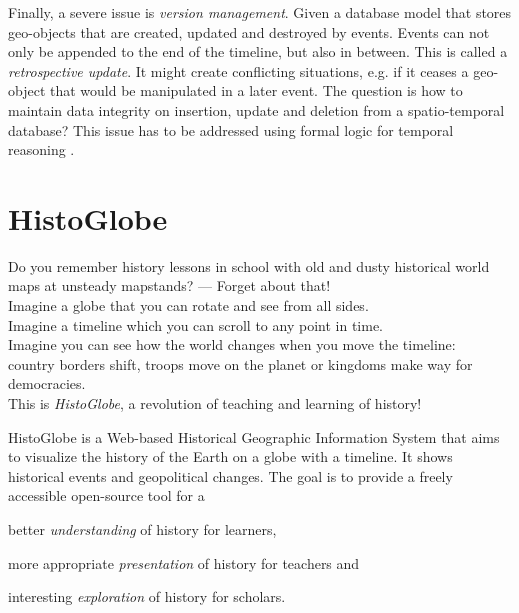 Finally, a severe issue is \emph{version management}. Given a database model that stores geo-objects that are created, updated and destroyed by events. Events can not only be appended to the end of the timeline, but also in between. This is called a \emph{retrospective update}. It might create conflicting situations, e.g. if it ceases a geo-object that would be manipulated in a later event. The question is how to maintain data integrity on insertion, update and deletion from a spatio-temporal database? This issue has to be addressed using formal logic for temporal reasoning
\cite[section 6]{peuquet99}.




\section{HistoGlobe} %
\label{sec:histoglobe}

\begin{quoteit}
  Do you remember history lessons in school with old and dusty historical world maps at unsteady mapstands? --- Forget about that! \\[0.5em]
  Imagine a globe that you can rotate and see from all sides. \\
  Imagine a timeline which you can scroll to any point in time. \\
  Imagine you can see how the world changes when you move the timeline: \\
  country borders shift, troops move on the planet or kingdoms make way for democracies. \\[0.5em]
  This is \emph{HistoGlobe}, a revolution of teaching and learning of history!
\end{quoteit}

HistoGlobe is a Web-based Historical Geographic Information System that aims to visualize the history of the Earth on a globe with a timeline. It shows historical events and geopolitical changes. The goal is to provide a freely accessible open-source tool for a

\begin{compactitem}
  \item better \emph{understanding} of history for learners,
  \item more appropriate \emph{presentation} of history for teachers and
  \item interesting \emph{exploration} of history for scholars.
\end{compactitem}

